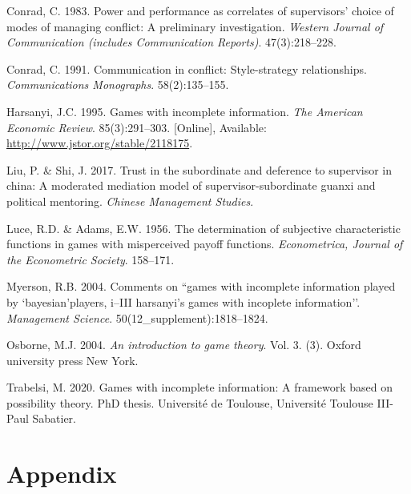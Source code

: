 \documentclass[11pt,preprint, authoryear]{elsarticle}
\numberwithin{equation}{section}
\numberwithin{figure}{section}
\numberwithin{table}{section}
\newlength{\cslhangindent}
\newenvironment{CSLReferences}%
  {\setlength{\parindent}{0pt}%
  \everypar{\setlength{\hangindent}{\cslhangindent}}\ignorespaces}%
  {\par}
\begin{document}
\hypertarget{refs}{}
\begin{CSLReferences}{1}{0}
\leavevmode\hypertarget{ref-power}{}%
Conrad, C. 1983. Power and performance as correlates of supervisors'
choice of modes of managing conflict: A preliminary investigation.
\emph{Western Journal of Communication (includes Communication
Reports)}. 47(3):218--228.

\leavevmode\hypertarget{ref-comm}{}%
Conrad, C. 1991. Communication in conflict: Style-strategy
relationships. \emph{Communications Monographs}. 58(2):135--155.

\leavevmode\hypertarget{ref-harsanyi}{}%
Harsanyi, J.C. 1995. Games with incomplete information. \emph{The
American Economic Review}. 85(3):291--303. {[}Online{]}, Available:
\url{http://www.jstor.org/stable/2118175}.

\leavevmode\hypertarget{ref-trust}{}%
Liu, P. \& Shi, J. 2017. Trust in the subordinate and deference to
supervisor in china: A moderated mediation model of
supervisor-subordinate guanxi and political mentoring. \emph{Chinese
Management Studies}.

\leavevmode\hypertarget{ref-luce1956}{}%
Luce, R.D. \& Adams, E.W. 1956. The determination of subjective
characteristic functions in games with misperceived payoff functions.
\emph{Econometrica, Journal of the Econometric Society}. 158--171.

\leavevmode\hypertarget{ref-2004com}{}%
Myerson, R.B. 2004. Comments on ``games with incomplete information
played by `bayesian'players, i--III harsanyi's games with incoplete
information''. \emph{Management Science}. 50(12\_supplement):1818--1824.

\leavevmode\hypertarget{ref-book}{}%
Osborne, M.J. 2004. \emph{An introduction to game theory}. Vol. 3. (3).
Oxford university press New York.

\leavevmode\hypertarget{ref-2020games}{}%
Trabelsi, M. 2020. Games with incomplete information: A framework based
on possibility theory. PhD thesis. Universit{é} de Toulouse,
Universit{é} Toulouse III-Paul Sabatier.

\end{CSLReferences}

\newpage

\hypertarget{appendix}{%
\section*{\texorpdfstring{Appendix
\label{app1}}{Appendix }}\label{appendix}}
\end{document}
